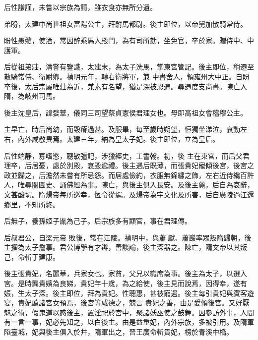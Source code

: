 \begin{pinyinscope}
 后性謙謹，未嘗以宗族為請，雖衣食亦無所分遺。



 弟盼，太建中尚世祖女富陽公主，拜駙馬都尉。後主即位，以帝舅加散騎常侍。



 盼性愚戇，使酒，常因醉乘馬入殿門，為有司所劾，坐免官，卒於家。贈侍中、中護軍。



 后從祖弟莊，清警有鑒識，太建末，為太子洗馬，掌東宮管記。後主即位，稍遷至散騎常侍、衛尉卿。禎明元年，轉右衛將軍，兼
 中書舍人，領雍州大中正。自盼卒後，太后宗屬唯莊為近，兼素有名望，猶是深被恩遇。尋遷度支尚書。陳亡入隋，為岐州司馬。



 後主沈皇后，諱婺華，儀同三司望蔡貞憲侯君理女也。母即高祖女會稽穆公主。



 主早亡，時后尚幼，而毀瘠過甚。及服畢，每至歲時朔望，恒獨坐涕泣，哀動左右，內外咸敬異焉。太建三年，納為皇太子妃。後主即位，立為皇后。



 后性端靜，寡嗜慾，聰敏彊記，涉獵經史，工書翰。初，後
 主在東宮，而后父君理卒，后居憂，處於別殿，哀毀逾禮。後主遇后既薄，而張貴妃寵傾後宮，後宮之政並歸之，后澹然未嘗有所忌怨。而居處儉約，衣服無錦繡之飾，左右近侍纔百許人，唯尋閱圖史、誦佛經為事。陳亡，與後主俱入長安。及後主薨，后自為哀辭，文甚酸切。隋煬帝每所巡幸，恆令從駕。及煬帝為宇文化及所害，后自廣陵過江還鄉里，不知所終。



 后無子，養孫姬子胤為己子。后宗族多有顯官，事在君理傳。



 后叔君公，自梁元帝
 敗後，常在江陵。禎明中，與蕭獻、蕭巖率眾叛隋歸朝，後主擢為太子詹事。君公博學有才辯，善談論，後主深器之。陳亡，隋文帝以其叛己，命斬于建康。



 後主張貴妃，名麗華，兵家女也。家貧，父兄以織席為事。後主為太子，以選入宮。是時龔貴嬪為良娣，貴妃年十歲，為之給使，後主見而說焉，因得幸，遂有娠，生太子深。後主即位，拜為貴妃。性聰惠，甚被寵遇。後主每引貴妃與賓客遊宴，貴妃薦諸宮女預焉，後宮等咸德之，兢言
 貴妃之善，由是愛傾後宮。又好厭魅之術，假鬼道以惑後主，置淫祀於宮中，聚諸妖巫使之鼓舞。因參訪外事，人間有一言一事，妃必先知之，以白後主。由是益重妃，內外宗族，多被引用。及隋軍陷臺城，妃與後主俱入於井，隋軍出之，晉王廣命斬貴妃，榜於青溪中橋。




\end{pinyinscope}

